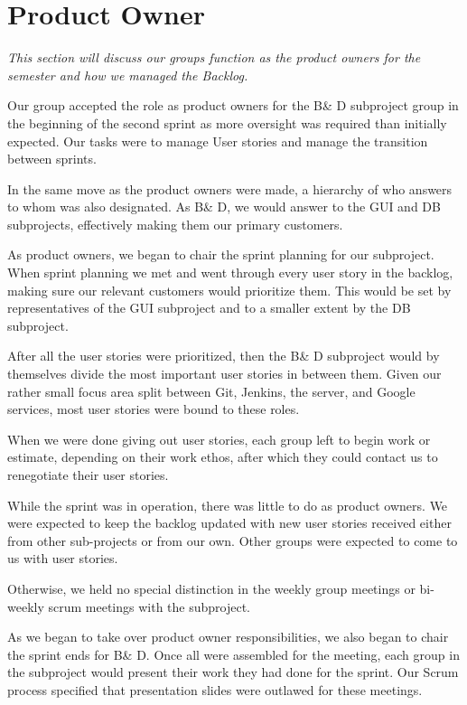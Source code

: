\section{Product Owner} \label{Roles_SecProductOwner}
\textit{This section will discuss our groups function as the product owners for the semester and how we managed the Backlog.}

Our group accepted the role as product owners for the B\& D subproject group in the beginning of the second sprint as more oversight was required than initially expected. Our tasks were to manage User stories and manage the transition between sprints.

In the same move as the product owners were made, a hierarchy of who answers to whom was also designated. As B\& D, we would answer to the GUI and DB subprojects, effectively making them our primary customers.

As product owners, we began to chair the sprint planning for our subproject. When sprint planning we met and went through every user story in the backlog, making sure our relevant customers would prioritize them. This would be set by representatives of the GUI subproject and to a smaller extent by the DB subproject.

After all the user stories were prioritized, then the B\& D subproject would by themselves divide the most important user stories in between them. Given our rather small focus area split between Git, Jenkins, the server, and Google services, most user stories were bound to these roles.

When we were done giving out user stories, each group left to begin work or estimate, depending on their work ethos, after which they could contact us to renegotiate their user stories.

While the sprint was in operation, there was little to do as product owners. We were expected to keep the backlog updated with new user stories received either from other sub-projects or from our own. Other groups were expected to come to us with user stories.

Otherwise, we held no special distinction in the weekly group meetings or bi-weekly scrum meetings with the subproject.

As we began to take over product owner responsibilities, we also began to chair the sprint ends for B\& D. Once all were assembled for the meeting, each group in the subproject would present their work they had done for the sprint. Our Scrum process specified that presentation slides were outlawed for these meetings.

